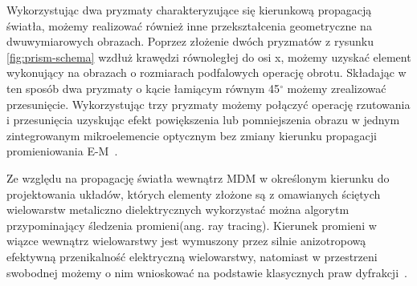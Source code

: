 Wykorzystując dwa pryzmaty charakteryzujące się kierunkową propagacją światła, możemy realizować również inne przekształcenia geometryczne na dwuwymiarowych obrazach. Poprzez złożenie dwóch pryzmatów z rysunku \ref{fig:prism-schema} wzdłuż krawędzi równoległej do osi x, możemy uzyskać element wykonujący na obrazach o rozmiarach podfalowych operację obrotu. Składając w ten sposób dwa pryzmaty o kącie łamiącym równym 45$^\circ$ możemy zrealizować przesunięcie. Wykorzystując trzy pryzmaty możemy połączyć operację rzutowania i przesunięcia uzyskując efekt powiększenia lub pomniejszenia obrazu w jednym zintegrowanym mikroelemencie optycznym bez zmiany kierunku propagacji promieniowania E-M~\cite{Zhao:08}.

Ze względu na propagację światła wewnątrz MDM w określonym kierunku do projektowania układów, których elementy złożone są z omawianych ściętych wielowarstw metaliczno dielektrycznych wykorzystać można algorytm przypominający śledzenia promieni(ang. ray tracing). Kierunek promieni w wiązce wewnątrz wielowarstwy jest wymuszony  przez silnie anizotropową efektywną przenikalność elektryczną wielowarstwy, natomiast w przestrzeni swobodnej możemy o nim wnioskować na podstawie klasycznych praw dyfrakcji~\cite{pastuszczak2011slanted}.

